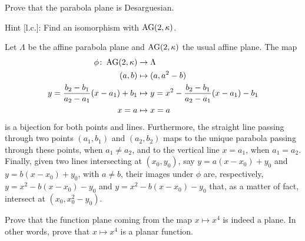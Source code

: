 
\begin{exr}
     Prove that the parabola plane\/ {} is Desarguesian.

     {\upshape Hint [l.c.]: Find an isomorphism with $\operatorname{AG}(2,\kappa)$.}
\end{exr}

\begin{solution}
    Let $\Lambda$ be the affine parabola plane and $\operatorname{AG}(2,\kappa)$ the usual affine plane. The map
    \begin{align*}
        \phi\colon\operatorname{AG}(2,\kappa)&\to\Lambda\\
        (a,b)&\mapsto(a,a^2-b)\\
        y=\frac{b_2-b_1}{a_2-a_1}(x-a_1)+b_1
            &\mapsto y=x^2-\frac{b_2-b_1}{a_2-a_1}(x-a_1)-b_1\\
        x=a&\mapsto x=a
    \end{align*}
    is a bijection for both points and lines. Furthermore, the straight line passing through two points $(a_1,b_1)$ and $(a_2,b_2)$ maps to the unique parabola passing through these points, when $a_1\ne a_2$, and to the vertical line $x=a_1$, when $a_1=a_2$. Finally, given two lines intersecting at $(x_0,y_0)$, say $y=a(x-x_0)+y_0$ and $y=b(x-x_0)+y_0$, with $a\ne b$, their images under $\phi$ are, respectively, $y=x^2-b(x-x_0)-y_0$ and $y=x^2-b(x-x_0)-y_0$ that, as a matter of fact, intersect at $(x_0,x_0^2-y_0)$.
\end{solution}

\begin{exr}
    Prove that the function plane coming from the map\/ $x \mapsto x^4$ is indeed a plane. In other words, prove that\/ $x \mapsto x^4$ is a planar function.
\end{exr}

